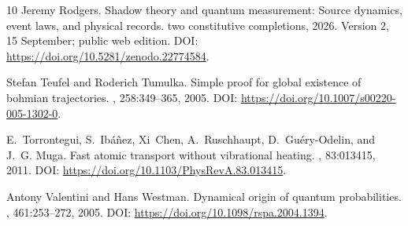 \documentclass[11pt]{article}
\theoremstyle{definition}\newtheorem{definition}[theorem]{Definition}
\theoremstyle{remark}\newtheorem{remark}[theorem]{Remark}
\begin{document}
{\begin{thebibliography}{10}
Jeremy Rodgers.
\newblock Shadow theory and quantum measurement: Source dynamics, event laws,
  and physical records. two constitutive completions, 2026.
\newblock Version 2, 15 September; public web edition. DOI:
  \url{https://doi.org/10.5281/zenodo.22774584}.

Stefan Teufel and Roderich Tumulka.
\newblock Simple proof for global existence of bohmian trajectories.
, 258:349--365, 2005.
\newblock DOI: \url{https://doi.org/10.1007/s00220-005-1302-0}.

E.~Torrontegui, S.~Ib{\'a}{\~n}ez, Xi~Chen, A.~Ruschhaupt, D.~Gu{\'e}ry-Odelin,
  and J.~G. Muga.
\newblock Fast atomic transport without vibrational heating.
, 83:013415, 2011.
\newblock DOI: \url{https://doi.org/10.1103/PhysRevA.83.013415}.

Antony Valentini and Hans Westman.
\newblock Dynamical origin of quantum probabilities.
, 461:253--272, 2005.
\newblock DOI: \url{https://doi.org/10.1098/rspa.2004.1394}.

\end{thebibliography}
}
\end{document}
